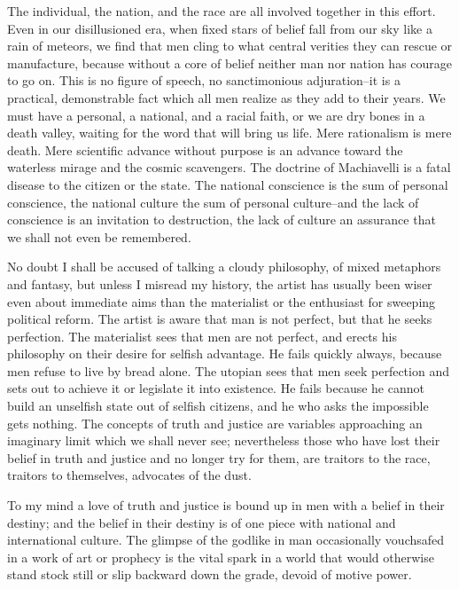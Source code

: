 \documentclass[9pt,twoside]{extarticle}
\begin{document}
The individual, the nation, and the race are all involved together in this effort. Even in our disillusioned era, when fixed stars of belief fall from our sky like a rain of meteors, we find that men cling to what central verities they can rescue or manufacture, because without a core of belief neither man nor nation has courage to go on. This is no figure of speech, no sanctimonious adjuration--it is a practical, demonstrable fact which all men realize as they add to their years. We must have a personal, a national, and a racial faith, or we are dry bones in a death valley, waiting for the word that will bring us life. Mere rationalism is mere death. Mere scientific advance without purpose is an advance toward the waterless mirage and the cosmic scavengers. The doctrine of Machiavelli is a fatal disease to the citizen or the state. The national conscience is the sum of personal conscience, the national culture the sum of personal culture--and the lack of conscience is an invitation to destruction, the lack of culture an assurance that we shall not even be remembered.

No doubt I shall be accused of talking a cloudy philosophy, of mixed metaphors and fantasy, but unless I misread my history, the artist has usually been wiser even about immediate aims than the materialist or the enthusiast for sweeping political reform. The artist is aware that man is not perfect, but that he seeks perfection. The materialist sees that men are not perfect, and erects his philosophy on their desire for selfish advantage. He fails quickly always, because men refuse to live by bread alone. The utopian sees that men seek perfection and sets out to achieve it or legislate it into existence. He fails because he cannot build an unselfish state out of selfish citizens, and he who asks the impossible gets nothing. The concepts of truth and justice are variables approaching an imaginary limit which we shall never see; nevertheless those who have lost their belief in truth and justice and no longer try for them, are traitors to the race, traitors to themselves, advocates of the dust.

To my mind a love of truth and justice is bound up in men with a belief in their destiny; and the belief in their destiny is of one piece with national and international culture. The glimpse of the godlike in man occasionally vouchsafed in a work of art or prophecy is the vital spark in a world that would otherwise stand stock still or slip backward down the grade, devoid of motive power.
\end{document}
